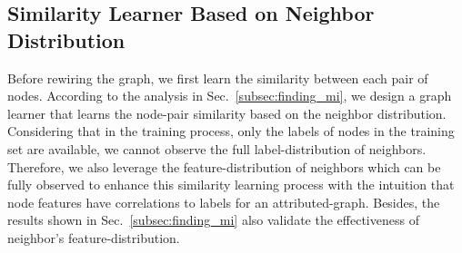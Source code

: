 \documentclass[sigconf]{acmart}
\begin{document}
	\subsection{Similarity Learner Based on Neighbor Distribution}
	Before rewiring the graph, we first learn the similarity between each pair of nodes. According to the analysis in Sec.~\ref{subsec:finding_mi}, we design a graph learner that learns the node-pair similarity based on the neighbor distribution. Considering that in the training process, only the labels of nodes in the training set are available, we cannot observe the full label-distribution of neighbors. Therefore, we also leverage the feature-distribution of neighbors which can be fully observed to enhance this similarity learning process with the intuition that node features have correlations to labels for an attributed-graph. Besides, the results shown in Sec.~\ref{subsec:finding_mi} also validate the effectiveness of neighbor's feature-distribution.
	
\end{document}
